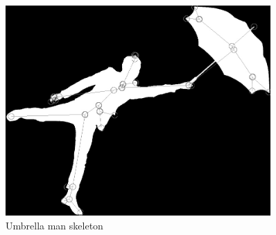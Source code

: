 \documentclass{article}
\begin{document}
\begin{figure}
            \includegraphics[width=0.9\textwidth]{umbrskelly}
  \caption{Umbrella man skeleton}
\end{figure}
\newpage
\newpage
\pagebreak

\newpage
\end{document}
